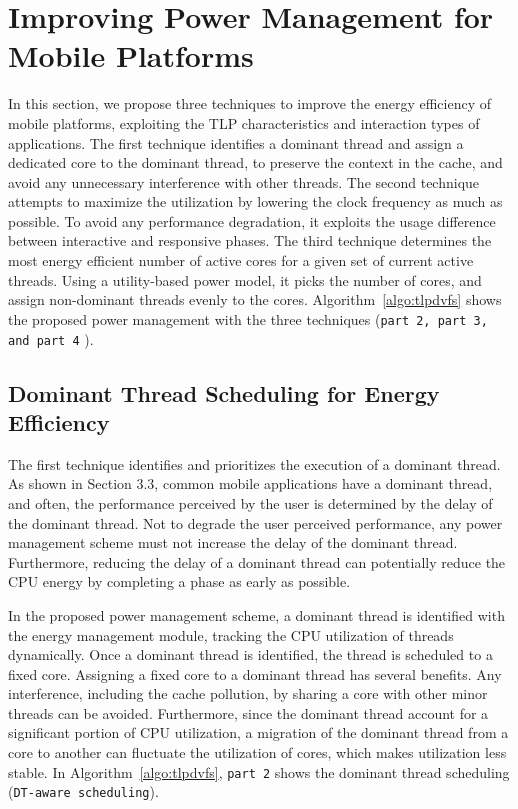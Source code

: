 \chapter{Improving Power Management for Mobile Platforms}

In this section, we propose three techniques to improve the energy efficiency of
mobile platforms, exploiting the TLP characteristics and interaction types of
applications. The first technique identifies a dominant thread and
assign a dedicated core to the dominant thread, to preserve the context
in the cache, and avoid any unnecessary interference with other threads.
The second technique attempts to maximize the utilization by lowering
the clock frequency as much as possible. To avoid any performance degradation,
it exploits the usage difference between interactive and responsive phases.
The third technique determines the most energy efficient number of
active cores for a given set of current active threads. Using a utility-based
power model, it picks the number of cores, and assign non-dominant threads
evenly to the cores.
Algorithm~\ref{algo:tlpdvfs} shows the proposed power management with the 
three techniques ({\tt part 2, part 3, and part 4} ).

\section{Dominant Thread Scheduling for Energy Efficiency}

The first technique identifies and prioritizes the execution of
a dominant thread. As shown in Section 3.3, 
common mobile applications have a dominant thread, and often,
the performance perceived by the user is determined by the delay of 
the dominant thread. Not to degrade the user perceived performance,
any power management scheme must not increase the delay of
the dominant thread. Furthermore, reducing the delay of a dominant thread
can potentially reduce the CPU energy by completing a phase as early
as possible.

In the proposed power management scheme, a dominant thread is identified
with the energy management module, tracking the CPU utilization of 
threads dynamically. Once a dominant thread is identified, the thread
is scheduled to a fixed core. Assigning a fixed core to a dominant thread
has several benefits. Any interference, including the cache pollution, 
by sharing a core with other minor threads can be avoided. Furthermore, since the
dominant thread account for a significant portion of CPU utilization,
a migration of the dominant thread from a core to another can fluctuate
the utilization of cores, which makes utilization less stable.
In Algorithm~\ref{algo:tlpdvfs}, {\tt part 2} shows the dominant thread scheduling
({\tt DT-aware scheduling}).

